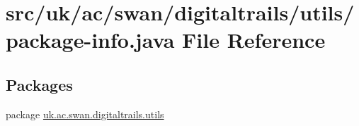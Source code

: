\hypertarget{utils_2package-info_8java}{\section{src/uk/ac/swan/digitaltrails/utils/package-\/info.java File Reference}
\label{utils_2package-info_8java}
}
\subsection*{Packages}
\begin{DoxyCompactItemize}
\item 
package \hyperlink{namespaceuk_1_1ac_1_1swan_1_1digitaltrails_1_1utils}{uk.\+ac.\+swan.\+digitaltrails.\+utils}
\end{DoxyCompactItemize}
